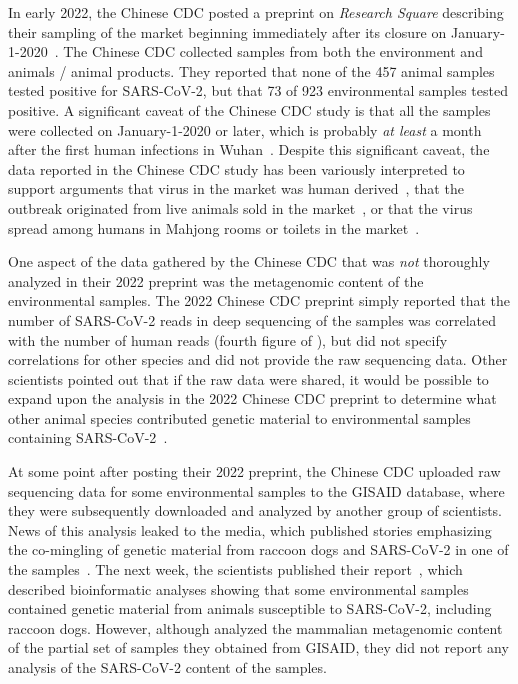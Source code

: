 \documentclass[9pt,twocolumn,twoside]{gsajnl_modified}
\begin{document}
In early 2022, the Chinese CDC posted a preprint on \textit{Research Square} describing their sampling of the market beginning immediately after its closure on January-1-2020~\citep{liu2022surveillance}.
The Chinese CDC collected samples from both the environment and animals / animal products.
They reported that none of the 457 animal samples tested positive for SARS-CoV-2, but that 73 of 923 environmental samples tested positive.
A significant caveat of the Chinese CDC study is that all the samples were collected on January-1-2020 or later, which is probably \emph{at least} a month after the first human infections in Wuhan~\citep{zhang2020viral,van2020emergence,he2020evaluating,pipes2021assessing,pekar2021timing,odni2022,pekar2022molecular}.
Despite this significant caveat, the data reported in the Chinese CDC study has been variously interpreted to support arguments that virus in the market was human derived~\citep{liu2022surveillance}, that the outbreak originated from live animals sold in the market~\citep{worobey2022huanan}, or that the virus spread among humans in Mahjong rooms or toilets in the market~\citep{courtier2022sars}.

One aspect of the data gathered by the Chinese CDC that was \emph{not} thoroughly analyzed in their 2022 preprint was the metagenomic content of the environmental samples. 
The 2022 Chinese CDC preprint simply reported that the number of SARS-CoV-2 reads in deep sequencing of the samples was correlated with the number of human reads (fourth figure of \citet{liu2022surveillance}), but did not specify correlations for other species and did not provide the raw sequencing data.
Other scientists pointed out that if the raw data were shared, it would be possible to expand upon the analysis in the 2022 Chinese CDC preprint to determine what other animal species contributed genetic material to environmental samples containing SARS-CoV-2~\citep{cohen2022anywhere,cohen2022studies}.

At some point after posting their 2022 preprint, the Chinese CDC uploaded raw sequencing data for some environmental samples to the GISAID database, where they were subsequently downloaded and analyzed by another group of scientists.
News of this analysis leaked to the media, which published stories emphasizing the co-mingling of genetic material from raccoon dogs and SARS-CoV-2 in one of the samples~\citep{wu2023atlantic,mueller2023nytimes}.
The next week, the scientists published their report~\citep{crits2023genetic}, which described bioinformatic analyses showing that some environmental samples contained genetic material from animals susceptible to SARS-CoV-2, including raccoon dogs.
However, although \citet{crits2023genetic} analyzed the mammalian metagenomic content of the partial set of samples they obtained from GISAID, they did not report any analysis of the SARS-CoV-2 content of the samples.
\end{document}
